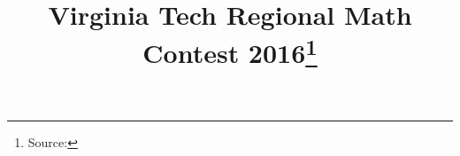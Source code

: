 \documentclass[10pt]{article}
\begin{document}
\title{Virginia Tech Regional Math Contest 2016\footnote{Source: \source}}
\author{\vspace{-2ex}}
\date{\vspace{-6ex}} %
\maketitle







\end{document}
